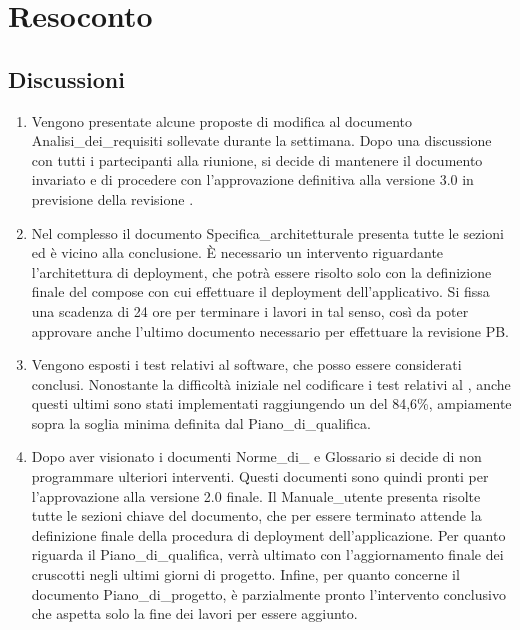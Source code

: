 \section{Resoconto} \label{sec:resoconto}
\subsection{Discussioni} \label{subsec:resdiscussione}
\begin{enumerate}
    \item Vengono presentate alcune proposte di modifica al documento Analisi\_dei\_requisiti sollevate durante la settimana. Dopo una discussione con tutti i partecipanti alla riunione, si decide di mantenere il documento invariato e di procedere con l'approvazione definitiva alla versione 3.0 in previsione della revisione .
    \item Nel complesso il documento Specifica\_architetturale presenta tutte le sezioni ed è vicino alla conclusione. È necessario un intervento riguardante l'architettura di deployment, che potrà essere risolto solo con la definizione finale del  compose con cui effettuare il deployment dell'applicativo. Si fissa una scadenza di 24 ore per terminare i lavori in tal senso, così da poter approvare anche l'ultimo documento necessario per effettuare la revisione PB.
    \item Vengono esposti i test relativi al software, che posso essere considerati conclusi. Nonostante la difficoltà iniziale nel codificare i test relativi al , anche questi ultimi sono stati implementati raggiungendo un  del 84,6\%, ampiamente sopra la soglia minima definita dal Piano\_di\_qualifica.
    \item Dopo aver visionato i documenti Norme\_di\_ e Glossario si decide di non programmare ulteriori interventi. Questi documenti sono quindi pronti per l'approvazione alla versione 2.0 finale. Il Manuale\_utente presenta risolte tutte le sezioni chiave del documento, che per essere terminato attende la definizione finale della procedura di deployment dell'applicazione. Per quanto riguarda il Piano\_di\_qualifica, verrà ultimato con l'aggiornamento finale dei cruscotti negli ultimi giorni di progetto. Infine, per quanto concerne il documento Piano\_di\_progetto, è parzialmente pronto l'intervento conclusivo che aspetta solo la fine dei lavori per essere aggiunto.
\end{enumerate}
\newpage
